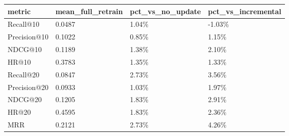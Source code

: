 \begin{tabular}{llll}
\toprule
metric & mean_full_retrain & pct_vs_no_update & pct_vs_incremental \\
\midrule
Recall@10 & 0.0487 & 1.04\% & -1.03\% \\
Precision@10 & 0.1022 & 0.85\% & 1.15\% \\
NDCG@10 & 0.1189 & 1.38\% & 2.10\% \\
HR@10 & 0.3783 & 1.35\% & 1.33\% \\
Recall@20 & 0.0847 & 2.73\% & 3.56\% \\
Precision@20 & 0.0933 & 1.03\% & 1.97\% \\
NDCG@20 & 0.1205 & 1.83\% & 2.91\% \\
HR@20 & 0.4595 & 1.83\% & 2.36\% \\
MRR & 0.2121 & 2.73\% & 4.26\% \\
\bottomrule
\end{tabular}
